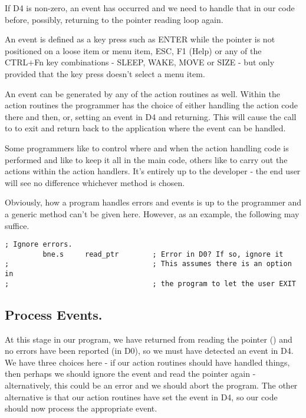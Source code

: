 If D4 is non-{}zero, an event has occurred and we need to handle
      that in our code before, possibly, returning to the pointer reading loop
      again.

An event is defined as a key press such as ENTER while the pointer
      is not positioned on a loose item or menu item, ESC, F1 (Help) or any of
      the CTRL+Fn key combinations -{} SLEEP, WAKE, MOVE or SIZE -{} but only
      provided that the key press doesn't select a menu item.

An event can be generated by any of the action routines as well.
      Within the action routines the programmer has the choice of either
      handling the action code there and then, or, setting an event in D4 and
      returning. This will cause the call to  to exit and return back
      to the application where the event can be handled.

Some programmers like to control where and when the action
      handling code is performed and like to keep it all in the main code,
      others like to carry out the actions within the action handlers. It's
      entirely up to the developer -{} the end user will see no difference
      whichever method is chosen.

Obviously, how a program handles errors and events is up to the
      programmer and a generic method can't be given here. However, as an
      example, the following may suffice.
\begin{lstlisting}[firstnumber=last,caption={EasyPEasy Standard Code - Error or Event Check},label={lst:EasyPEasy-8}]
; Ignore errors.
         bne.s     read_ptr        ; Error in D0? If so, ignore it
;                                  ; This assumes there is an option in
;                                  ; the program to let the user EXIT
\end{lstlisting}


\subsection{Process Events.}

At this stage in our program, we have returned from reading the
      pointer () and no errors have been reported (in D0), so we must
      have detected an event in D4. We have three choices here -{} if our action
      routines should have handled things, then perhaps we should ignore the
      event and read the pointer again -{} alternatively, this could be an error
      and we should abort the program. The other alternative is that our
      action routines have set the event in D4, so our code should now process
      the appropriate event.

